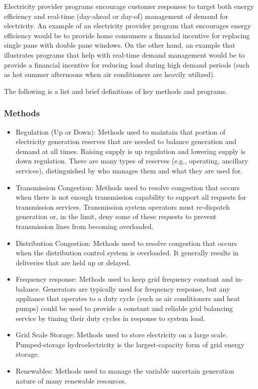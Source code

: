 Electricity provider programs encourage customer responses to target both energy efficiency and real-time
(day-ahead or day-of) management of demand for electricity. An example of an electricity provider program 
that encourages energy efficiency would be to provide home consumers a financial incentive for replacing 
single pane with double pane windows.  On the other hand, an example that illustrates programs that help 
with real-time demand management would be to provide a financial incentive for reducing load 
during high demand periods 
(such as hot summer afternoons when air conditioners are heavily utilized). 

The following is a list and brief definitions of key methods and programs.  

\subsubsection{Methods}
\begin{itemize}
\item Regulation (Up or Down): Methods used to maintain that portion of electricity generation reserves 
that are needed to balance generation and demand at all times.  Raising supply is up regulation and lowering 
supply is down regulation. There are many types of reserves 
(e.g., operating, ancillary services), distinguished by who manages them and what they are used for.

\item Transmission Congestion: Methods used to resolve congestion that occurs when there is not enough 
transmission capability to support all requests for transmission services. Transmission system operators 
must re-dispatch generation or, 
in the limit, deny some of these requests to prevent transmission lines from becoming overloaded.

\item Distribution Congestion:  Methods used to resolve congestion that occurs when the 
distribution control system 
is overloaded.  It generally results in deliveries that are held up or delayed.  

\item Frequency response:  Methods used to keep grid frequency constant and in-balance. 
Generators are typically used for frequency response, but any appliance that operates to a duty cycle 
(such as air conditioners and heat pumps) could be used to provide a 
constant and reliable grid balancing service by timing their duty cycles in response to system load.   

\item Grid Scale Storage:  Methods used to store electricity on a large scale. 
Pumped-storage hydroelectricity is the largest-capacity form of grid energy storage. 

\item Renewables:  Methods used to manage the variable uncertain generation nature of 
many renewable resources. 
\end{itemize}


